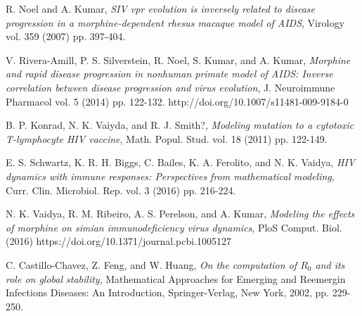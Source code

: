 \documentclass[11pt, oneside]{article}    %
\begin{document}
\begin{thebibliography}{99}
R. Noel and A. Kumar, {\em SIV vpr evolution is inversely related to disease progression in a morphine-dependent rhesus macaque model of AIDS}, Virology vol. 359 (2007) pp. 397-404.

V. Rivera-Amill, P. S. Silverstein, R. Noel, S. Kumar, and A. Kumar,  {\em Morphine and rapid disease progression in nonhuman primate model of AIDS: Inverse correlation between disease progression and virus evolution}, J. Neuroimmune Pharmacol vol. 5 (2014) pp. 122-132. http://doi.org/10.1007/s11481-009-9184-0

B. P. Konrad, N. K. Vaiyda, and R. J. Smith?, {\em Modeling mutation to a cytotoxic T-lymphocyte HIV vaccine}, Math. Popul. Stud. vol. 18 (2011) pp. 122-149.

E. S. Schwartz, K. R. H. Biggs, C. Bailes, K. A. Ferolito, and N. K. Vaidya, {\em HIV dynamics with immune responses: Perspectives from mathematical modeling}, Curr. Clin. Microbiol. Rep. vol. 3 (2016) pp. 216-224.

N. K. Vaidya, R. M. Ribeiro, A. S. Perelson, and A. Kumar,  {\em Modeling the effects of morphine on simian immunodeficiency virus dynamics}, PloS Comput. Biol. (2016) https://doi.org/10.1371/journal.pcbi.1005127

C. Castillo-Chavez, Z. Feng, and W. Huang,  {\em On the computation of $R_0$ and its role on global stability}, Mathematical Approaches for Emerging and Reemergin Infections Diseases: An Introduction, Springer-Verlag, New York, 2002, pp. 229-250.


\end{thebibliography}
\end{document}
